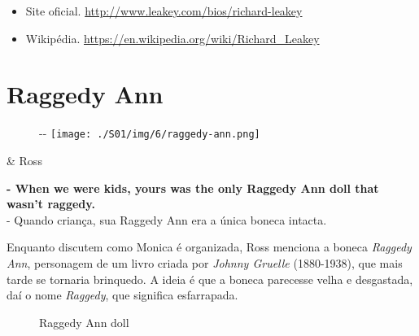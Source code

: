 \begin{itemize}
\tightlist
\item
  \sloppy Site oficial. \url{http://www.leakey.com/bios/richard-leakey}
\item
  \sloppy Wikipédia. \url{https://en.wikipedia.org/wiki/Richard_Leakey}
\end{itemize}

\hypertarget{raggedy-ann}{%
\section{Raggedy Ann}\label{raggedy-ann}}

\begin{figure}[!ht]
  \begin{adjustwidth}{-\oddsidemargin-1in}{-\rightmargin}
    \centering
    \texttt{[image: ./S01/img/6/raggedy-ann.png]}
  \end{adjustwidth}
\end{figure}

\begin{tcolorbox}[enhanced,center upper,
    drop fuzzy shadow southeast, boxrule=0.3pt,
    lower separated=false, breakable,
    colframe=black!30!dialogoBorder,colback=white]
\begin{minipage}[c]{0.16\linewidth}
   & \centering \scriptsize{Ross}
\end{minipage}
\hfill
\begin{minipage}[c]{0.8\linewidth}
  \textbf{- When we were kids, yours was the only Raggedy Ann doll that wasn't raggedy.}\\
  - Quando criança, sua Raggedy Ann era a única boneca intacta.
\end{minipage}
\end{tcolorbox}

Enquanto discutem como Monica é organizada, Ross menciona a boneca
\emph{Raggedy Ann}, personagem de um livro criada por \emph{Johnny
Gruelle} (1880-1938), que mais tarde se tornaria brinquedo. A ideia é
que a boneca parecesse velha e desgastada, daí o nome \emph{Raggedy},
que significa esfarrapada.

\begin{figure}
  \centering
    \caption{Raggedy Ann doll\label{fig:raggedy-ann-doll}}
\end{figure}


